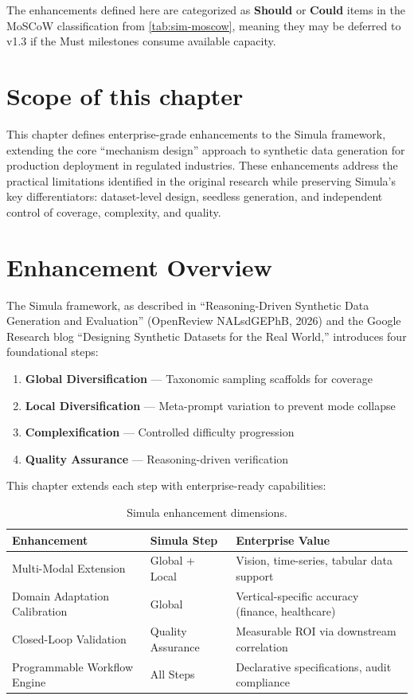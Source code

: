 \documentclass[12pt,a4paper,twoside]{report}
\begin{document}
\noindent
The enhancements defined here are categorized as \textbf{Should} or \textbf{Could}
items in the MoSCoW classification from \cref{tab:sim-moscow}, meaning they may
be deferred to v1.3 if the Must milestones consume available capacity.

\section*{Scope of this chapter}

This chapter defines enterprise-grade enhancements to the Simula framework, extending
the core ``mechanism design'' approach to synthetic data generation for production
deployment in regulated industries. These enhancements address the practical limitations
identified in the original research while preserving Simula's key differentiators:
dataset-level design, seedless generation, and independent control of coverage,
complexity, and quality.

\section{Enhancement Overview}

The Simula framework, as described in ``Reasoning-Driven Synthetic Data Generation
and Evaluation'' (OpenReview NALsdGEPhB, 2026) and the Google Research blog
``Designing Synthetic Datasets for the Real World,'' introduces four foundational
steps:

\begin{enumerate}
\item \textbf{Global Diversification} --- Taxonomic sampling scaffolds for coverage
\item \textbf{Local Diversification} --- Meta-prompt variation to prevent mode collapse
\item \textbf{Complexification} --- Controlled difficulty progression
\item \textbf{Quality Assurance} --- Reasoning-driven verification
\end{enumerate}

This chapter extends each step with enterprise-ready capabilities:

\begin{table}[htbp]
\centering
\caption{Simula enhancement dimensions.}
\label{tab:enhancement-dimensions}
\footnotesize
\begin{tabularx}{\textwidth}{@{}l l X@{}}
\toprule
\textbf{Enhancement} & \textbf{Simula Step} & \textbf{Enterprise Value} \\
\midrule
Multi-Modal Extension & Global + Local & Vision, time-series, tabular data support \\
Domain Adaptation Calibration & Global & Vertical-specific accuracy (finance, healthcare) \\
Closed-Loop Validation & Quality Assurance & Measurable ROI via downstream correlation \\
Programmable Workflow Engine & All Steps & Declarative specifications, audit compliance \\
\bottomrule
\end{tabularx}
\end{table}
\end{document}
